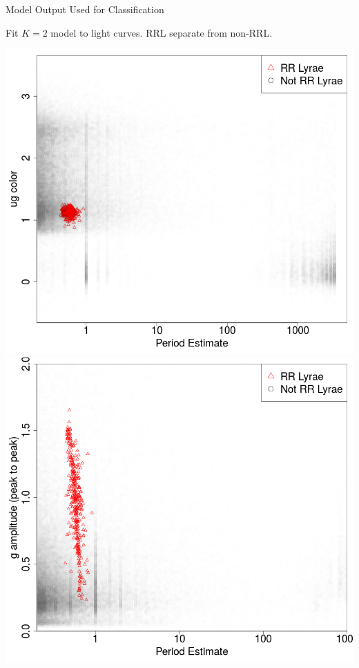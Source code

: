 \documentclass[12pt]{beamer}
\begin{document}
\begin{frame}{Model Output Used for Classification}

  \begin{center}
    Fit $K=2$ model to light curves. RRL separate from non-RRL.
  \end{center}
  
\begin{center}
  \includegraphics[scale=.2]{figs/sdss_color_period.png}
  \includegraphics[scale=.2]{figs/sdss_gamp_period.png}
\end{center}



\end{frame}
\end{document}
